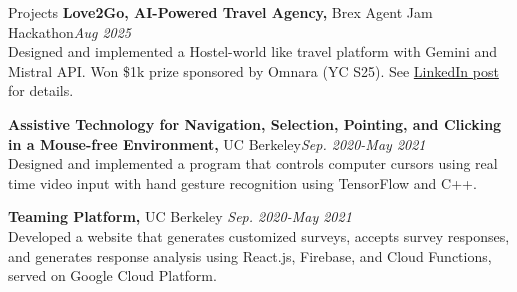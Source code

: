 \documentclass{resume}
\begin{document}
\begin{rSection}{Projects}
{\bf Love2Go, AI-Powered Travel Agency,} Brex Agent Jam Hackathon\hfill{\em Aug 2025}
\\{Designed and implemented a Hostel-world like travel platform with Gemini and Mistral API. Won \$1k prize sponsored by Omnara (YC S25). See {\href{https://www.linkedin.com/feed/update/urn:li:activity:7366000264480247808/?skipRedirect=true}{LinkedIn post}} for details.}

{\bf Assistive Technology for Navigation, Selection, Pointing, and Clicking in a Mouse-free Environment,} UC Berkeley\hfill{\em Sep. 2020-May 2021}
\\{Designed and implemented a program that controls computer cursors using real time video input with hand gesture recognition using TensorFlow and C++.}


{\bf Teaming Platform,} UC Berkeley \hfill{\em Sep. 2020-May 2021}
\\{Developed a website that generates customized surveys, accepts survey responses, and generates response analysis using React.js, Firebase, and Cloud Functions, served on Google Cloud Platform.}



\end{rSection}
\end{document}
